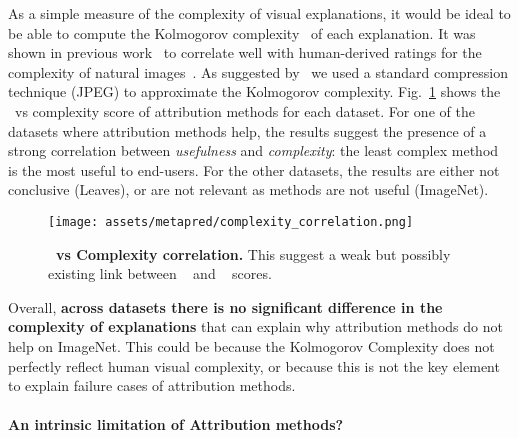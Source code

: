 As a simple measure of the complexity of visual explanations, it would be ideal to be able to compute the Kolmogorov complexity~\cite{li2004similarity} of each explanation. It was shown in previous work~\cite{da2011image} to correlate well with human-derived ratings for the complexity of natural images~\cite{forsythe2008confounds,forsythe2009visual}. As suggested by~\cite{li2004similarity,de2006approximating} we used a standard compression technique (JPEG) to approximate the Kolmogorov complexity.
Fig.~\ref{fig:metapred:complexity} shows the \metric~vs complexity score of attribution methods for each dataset. For one of the datasets where attribution methods help, the results suggest the presence of a strong correlation between \textit{usefulness} and \textit{complexity}: the least complex method is the most useful to end-users. For the other datasets, the results are either not conclusive (Leaves), or are not relevant as methods are not useful (ImageNet). 
\begin{figure}[ht]
  \begin{center}
    \texttt{[image: assets/metapred/complexity\_correlation.png]}
  \end{center}
  \caption{\textbf{\metric~vs Complexity correlation.} 
  This suggest a weak but possibly existing link between \complexity~ and \metric~ scores. 
    }
    \label{fig:metapred:complexity}
\end{figure}
Overall, \textbf{across datasets there is no significant difference in the complexity of explanations} that can explain why attribution methods do not help on ImageNet.
This could be because the Kolmogorov Complexity does not perfectly reflect human visual complexity, or because this is not the key element to explain failure cases of attribution methods.

\paragraph{An intrinsic limitation of Attribution methods?} 

